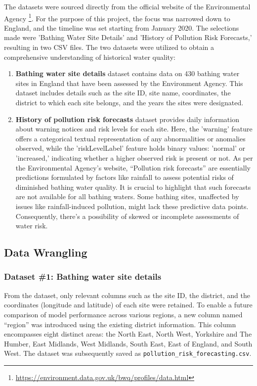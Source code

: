 \documentclass[a4paper,11pt]{report}
\begin{document}
The datasets were sourced directly from the official website of the Environmental Agency
\footnote{\href{https://environment.data.gov.uk/bwq/profiles/data.html}{https://environment.data.gov.uk/bwq/profiles/data.html}}. For the purpose of this project, the focus was narrowed down to England, and the timeline was set starting from January 2020. The selections made were 'Bathing Water Site Details' and 'History of Pollution Risk Forecasts,' resulting in two CSV files. The two datasets were utilized to obtain a comprehensive understanding of historical water quality:

\begin{enumerate}
\item \textbf{Bathing water site details} dataset contains data on 430 bathing water sites in England that have been assessed by the Environment Agency. This dataset includes details such as the site ID, site name, coordinates, the district to which each site belongs, and the years the sites were designated.

\item \textbf{History of pollution risk forecasts} dataset provides daily information about warning notices and risk levels for each site. Here, the 'warning' feature offers a categorical textual representation of any abnormalities or anomalies observed, while the 'riskLevelLabel' feature holds binary values: 'normal' or 'increased,' indicating whether a higher observed risk is present or not. As per the Environmental Agency's website, “Pollution risk forecasts” are essentially predictions formulated by factors like rainfall to assess potential risks of diminished bathing water quality. It is crucial to highlight that such forecasts are not available for all bathing waters. Some bathing sites, unaffected by issues like rainfall-induced pollution, might lack these predictive data points. Consequently, there's a possibility of skewed or incomplete assessments of water risk.

\end{enumerate}

\subsection{Data Wrangling}

\subsubsection{Dataset \#1: Bathing water site details}
From the dataset, only relevant columns such as the site ID, the district, and the coordinates (longitude and latitude) of each site were retained. To enable a future comparison of model performance across various regions, a new column named “region” was introduced using the existing district information. This column encompasses eight distinct areas: the North East, North West, Yorkshire and The Humber, East Midlands, West Midlands, South East, East of England, and South West. The dataset was subsequently saved as \verb|pollution_risk_forecasting.csv|.
\end{document}

